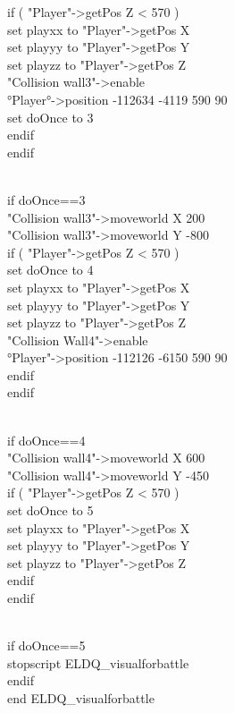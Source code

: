 if ( "Player"-\textgreater getPos Z \textless{} 570 )\\
set playxx to "Player"-\textgreater getPos X\\
set playyy to "Player"-\textgreater getPos Y\\
set playzz to "Player"-\textgreater getPos Z\\
"Collision wall3"-\textgreater enable\\
°Player°-\textgreater position -112634 -4119 590 90\\
set doOnce to 3\\
endif\\
endif\\
\strut \\
if doOnce==3\\
"Collision wall3"-\textgreater moveworld X 200\\
"Collision wall3"-\textgreater moveworld Y -800\\
if ( "Player"-\textgreater getPos Z \textless{} 570 )\\
set doOnce to 4\\
set playxx to "Player"-\textgreater getPos X\\
set playyy to "Player"-\textgreater getPos Y\\
set playzz to "Player"-\textgreater getPos Z\\
"Collision Wall4"-\textgreater enable\\
°Player"-\textgreater position -112126 -6150 590 90\\
endif\\
endif\\
\strut \\
if doOnce==4\\
"Collision wall4"-\textgreater moveworld X 600\\
"Collision wall4"-\textgreater moveworld Y -450\\
if ( "Player"-\textgreater getPos Z \textless{} 570 )\\
set doOnce to 5\\
set playxx to "Player"-\textgreater getPos X\\
set playyy to "Player"-\textgreater getPos Y\\
set playzz to "Player"-\textgreater getPos Z\\
endif\\
endif\\
\strut \\
if doOnce==5\\
stopscript ELDQ\_visualforbattle\\
endif\\
end ELDQ\_visualforbattle
